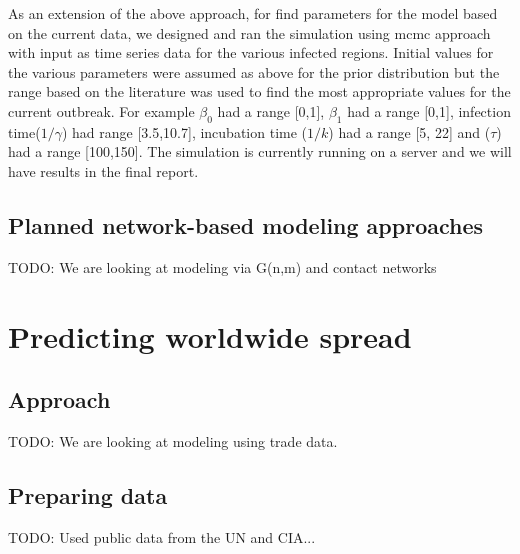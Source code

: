 \documentclass[10pt, journal,onecolumn]{IEEEtran}
\begin{document}
As an extension of the above approach, for find parameters for the model based on the current data, we designed and ran the simulation using mcmc approach with input as time series data for the various infected regions.
Initial values for the various parameters were assumed as above for the prior distribution but the range based on the literature was used to find the most appropriate values for the current outbreak. For example $\beta_0$  had a range [0,1],  $\beta_1$ had a range [0,1], infection time($1/\gamma$) had range [3.5,10.7], incubation time ($1/k$) had a range [5, 22] and ($\tau$)  had a range [100,150]. The simulation is currently running on a server and we will have results in the final report.




\subsection*{\textbf{Planned network-based modeling approaches}}

TODO: We are looking at modeling via G(n,m) and contact networks


\section{Predicting worldwide spread}
\label{sec:Worldwide}

\subsection*{\textbf{Approach}}
TODO: We are looking at modeling using trade data.

\subsection*{\textbf{Preparing data}}

TODO: Used public data from the UN and CIA...








\end{document}
